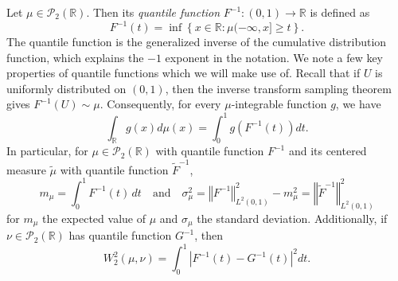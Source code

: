 \documentclass{amsart}
\numberwithin{equation}{section}
\theoremstyle{plain}
\theoremstyle{definition}
\newcommand\bR{{\mathbb R}}
\newcommand{\norm}[1]{\left\Vert#1\right\Vert}
\newcommand{\rar}{\rightarrow}
\begin{document}
Let $\mu\in \mathcal{P}_2(\mathbb{R})$. 
Then its \emph{quantile function} $F^{-1}: (0,1) \rar \bR$ is defined as
\begin{equation*}
    F^{-1} (t) = \inf \left\{x\in\mathbb{R}: \mu(-\infty, x]\geq t\right\}.
\end{equation*}
The quantile function  is the generalized inverse of the cumulative distribution function, which explains the $-1$ exponent in the notation.  
We note a few key properties of quantile functions 
 which we will make use of. Recall that if $U$ is uniformly distributed on $(0,1)$, then the inverse 
transform sampling theorem gives $F^{-1}(U)\sim\mu$. Consequently, for every 
$\mu$-integrable function $g$, we have 
$$\int_{\mathbb{R}} g(x) d\mu(x)=\int_0^1 g(F^{-1}(t)) dt.$$ 
In particular, for $\mu\in\mathcal{P}_2(\mathbb{R})$ with quantile function $F^{-1}$ and its centered measure $\tilde{\mu}$ with quantile function $\tilde{F}^{-1}$,
\[
m_\mu = \int_0^1 F^{-1}(t)\, dt \quad \textrm{and} \quad  \sigma_\mu^2  = \norm{F^{-1}}_{L^2(0,1)}^2 - m_\mu^2 = \norm{\tilde{F}^{-1}}_{L^2(0,1)}^2
\]
for $m_\mu$ the expected value of $\mu$ and $\sigma_\mu$ the standard deviation.
Additionally, if $\nu\in \mathcal{P}_2(\mathbb{R})$ has quantile function $G^{-1}$, then
\[
W_2^2(\mu,\nu)
= \int_0^1 |F^{-1}(t) - G^{-1}(t)|^2 dt.
\]
\end{document}
